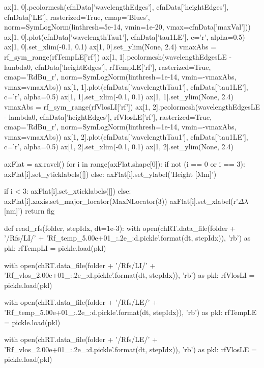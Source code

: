 \begin{pycode}[TimeDepRT]
    ax[1, 0].pcolormesh(cfnData['wavelengthEdges'], cfnData['heightEdges'], cfnData['LE'],
                        rasterized=True, cmap='Blues',
                        norm=SymLogNorm(linthresh=5e-14, vmin=1e-20, vmax=cfnData['maxVal']))
    ax[1, 0].plot(cfnData['wavelengthTau1'], cfnData['tau1LE'], c='r', alpha=0.5)
    ax[1, 0].set_xlim(-0.1, 0.1)
    ax[1, 0].set_ylim(None, 2.4)
    vmaxAbs = rf_sym_range(rfTempLE['rf'])
    ax[1, 1].pcolormesh(wavelengthEdgesLE - lambda0, cfnData['heightEdges'], rfTempLE['rf'],
                        rasterized=True, cmap='RdBu_r',
                        norm=SymLogNorm(linthresh=1e-14, vmin=-vmaxAbs, vmax=vmaxAbs))
    ax[1, 1].plot(cfnData['wavelengthTau1'], cfnData['tau1LE'], c='r', alpha=0.5)
    ax[1, 1].set_xlim(-0.1, 0.1)
    ax[1, 1].set_ylim(None, 2.4)
    vmaxAbs = rf_sym_range(rfVlosLI['rf'])
    ax[1, 2].pcolormesh(wavelengthEdgesLE - lambda0, cfnData['heightEdges'], rfVlosLE['rf'],
                        rasterized=True, cmap='RdBu_r',
                        norm=SymLogNorm(linthresh=1e-14, vmin=-vmaxAbs, vmax=vmaxAbs))
    ax[1, 2].plot(cfnData['wavelengthTau1'], cfnData['tau1LE'], c='r', alpha=0.5)
    ax[1, 2].set_xlim(-0.1, 0.1)
    ax[1, 2].set_ylim(None, 2.4)

    axFlat = ax.ravel()
    for i in range(axFlat.shape[0]):
        if not (i == 0 or i == 3):
            axFlat[i].set_yticklabels([])
        else:
            axFlat[i].set_ylabel('Height [Mm]')

        if i < 3:
            axFlat[i].set_xticklabels([])
        else:
            axFlat[i].xaxis.set_major_locator(MaxNLocator(3))
            axFlat[i].set_xlabel(r'$\Delta\lambda$ [nm]')
    return fig

def read_rfs(folder, stepIdx, dt=1e-3):
    with open(chRT.data_file(folder + '/Rfs/LI/' + 'Rf_temp_5.00e+01_{:.2e}_{:d}.pickle'.format(dt, stepIdx)), 'rb') as pkl:
        rfTempLI = pickle.load(pkl)

    with open(chRT.data_file(folder + '/Rfs/LI/' + 'Rf_vlos_2.00e+01_{:.2e}_{:d}.pickle'.format(dt, stepIdx)), 'rb') as pkl:
        rfVlosLI = pickle.load(pkl)

    with open(chRT.data_file(folder + '/Rfs/LE/' + 'Rf_temp_5.00e+01_{:.2e}_{:d}.pickle'.format(dt, stepIdx)), 'rb') as pkl:
        rfTempLE = pickle.load(pkl)

    with open(chRT.data_file(folder + '/Rfs/LE/' + 'Rf_vlos_2.00e+01_{:.2e}_{:d}.pickle'.format(dt, stepIdx)), 'rb') as pkl:
        rfVlosLE = pickle.load(pkl)


\end{pycode}
